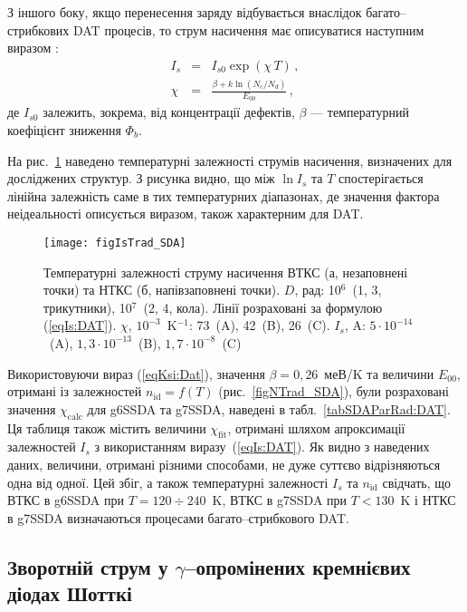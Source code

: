З іншого боку,  якщо перенесення заряду відбувається внаслідок багато--стрибкових DAT процесів, то струм насичення має описуватися наступним виразом \cite{Evstropov}:
\begin{eqnarray}
  I_s&=&I_{s0}\exp(\chi\,T) \label{eqIs:DAT}\,,\\
   \chi&=&\frac{\beta+k\ln(N_c/N_d)}{E_{00}}\,, \label{eqKsi:Dat}
\end{eqnarray}
де
$I_{s0}$ залежить, зокрема, від концентрації дефектів,
$\beta$ --- температурний коефіцієнт зниження $\Phi_b$.

На рис.~\ref{figIsTrad_SDA} наведено температурні залежності струмів насичення, визначених для досліджених структур.
З рисунка видно, що між $\ln I_s$ та $T$ спостерігається лінійна залежність саме в тих температурних діапазонах,
де значення фактора неідеальності описується виразом, також характерним для DAT.


\begin{figure}
\center
\texttt{[image: figIsTrad\_SDA]}
\caption{\label{figIsTrad_SDA}
Температурні залежності струму насичення ВТКС (а, незаповнені точки)
та НТКС (б, напівзаповнені точки).
$D$, рад: 10$^6$~(1, 3, трикутники), 10$^7$~(2, 4, кола).
Лінії розраховані за формулою (\ref{eqIs:DAT}).
$\chi$, $10^{-3}$~K$^{-1}$: 73~(A), 42~(B), 26~(C).
$I_s$, A: $5\cdot10^{-14}$~(A),
$1,3\cdot10^{-13}$~(B),
$1,7\cdot10^{-8}$~(C)
}%
\end{figure}

Використовуючи вираз (\ref{eqKsi:Dat}), значення $\beta=0,26$~меВ/K \cite{Aboelfotoh, Evstropov} та величини $E_{00}$,
отримані із залежностей $n_\mathrm{id}=f(T)$ (рис.~\ref{figNTrad_SDA}),
були розраховані значення $\chi_\mathrm{calc}$ для g6SSDA та g7SSDA, наведені в табл.~\ref{tabSDAParRad:DAT}.
Ця таблиця також містить величини $\chi_\mathrm{fit}$, отримані шляхом апроксимації залежностей $I_s$ з використанням виразу~(\ref{eqIs:DAT}).
Як видно з наведених даних, величини, отримані різними способами, не дуже суттєво відрізняються одна від одної.
Цей збіг, а також температурні залежності $I_s$ та $n_\mathrm{id}$ свідчать,
що ВТКС в g6SSDA при $T=120\div240$~K, ВТКС в g7SSDA при $T<130$~K і НТКС в g7SSDA визначаються процесами багато--стрибкового DAT.






\subsection{Зворотній струм у $\gamma$--опромінених кремнієвих діодах Шотткі}

